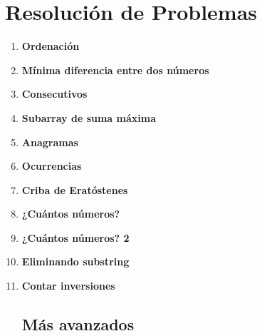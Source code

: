 \section{Resolución de Problemas}
\begin{enumerate}
    \item \textbf{Ordenación}\\
    

    \item \textbf{Mínima diferencia entre dos números}\\
    

    \item \textbf{Consecutivos}\\
    

    \item \textbf{Subarray de suma máxima}\\
    

    \item \textbf{Anagramas}\\
    

    \item \textbf{Ocurrencias}\\
    

    \item \textbf{Criba de Eratóstenes}\\
    

    \item \textbf{¿Cuántos números?}\\
    

    \item \textbf{¿Cuántos números? 2}\\
    

    \item \textbf{Eliminando substring}\\
    

    \item \textbf{Contar inversiones}\\
    

    \subsection*{Más avanzados}


\end{enumerate}
